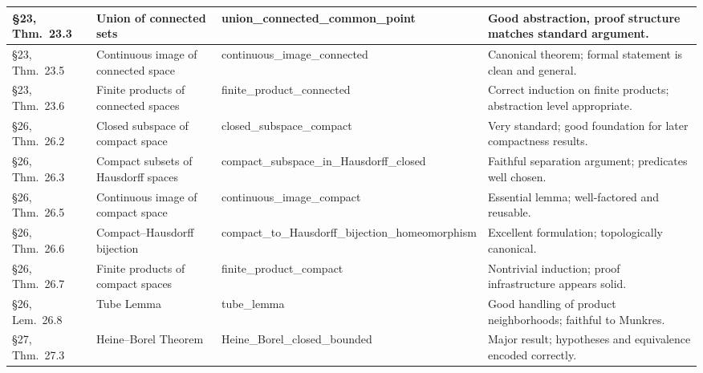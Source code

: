 \documentclass[a4paper,UKenglish,cleveref, autoref, thm-restate]{lipics-v2021}
\newcommand{\formal}[1]{{\ttfamily\small #1}}
\begin{document}
\begin{longtable}{|p{2.6cm}|p{2.8cm}|p{3.1cm}|p{4.9cm}|}
§23, Thm.\ 23.3 &
Union of connected sets &
\formal{union\_\allowbreak connected\_\allowbreak common\_\allowbreak point} &
Good abstraction, proof structure matches standard argument. \\
\hline

§23, Thm.\ 23.5 &
Continuous image of connected space &
\formal{continuous\_\allowbreak image\_\allowbreak connected} &
Canonical theorem; formal statement is clean and general. \\
\hline

§23, Thm.\ 23.6 &
Finite products of connected spaces &
\formal{finite\_\allowbreak product\_\allowbreak connected} &
Correct induction on finite products; abstraction level appropriate. \\
\hline

§26, Thm.\ 26.2 &
Closed subspace of compact space &
\formal{closed\_\allowbreak subspace\_\allowbreak compact} &
Very standard; good foundation for later compactness results. \\
\hline

§26, Thm.\ 26.3 &
Compact subsets of Hausdorff spaces &
\formal{compact\_\allowbreak subspace\_\allowbreak in\_\allowbreak Hausdorff\_\allowbreak closed} &
Faithful separation argument; predicates well chosen. \\
\hline

§26, Thm.\ 26.5 &
Continuous image of compact space &
\formal{continuous\_\allowbreak image\_\allowbreak compact} &
Essential lemma; well-factored and reusable. \\
\hline

§26, Thm.\ 26.6 &
Compact--Hausdorff bijection &
\formal{compact\_\allowbreak to\_\allowbreak Hausdorff\_\allowbreak bijection\_\allowbreak homeomorphism} &
Excellent formulation; topologically canonical. \\
\hline

§26, Thm.\ 26.7 &
Finite products of compact spaces &
\formal{finite\_\allowbreak product\_\allowbreak compact} &
Nontrivial induction; proof infrastructure appears solid. \\
\hline

§26, Lem.\ 26.8 &
Tube Lemma &
\formal{tube\_\allowbreak lemma} &
Good handling of product neighborhoods; faithful to Munkres. \\
\hline

§27, Thm.\ 27.3 &
Heine--Borel Theorem &
\formal{Heine\_\allowbreak Borel\_\allowbreak closed\_\allowbreak bounded} &
Major result; hypotheses and equivalence encoded correctly. \\
\hline


\end{longtable}
\end{document}
